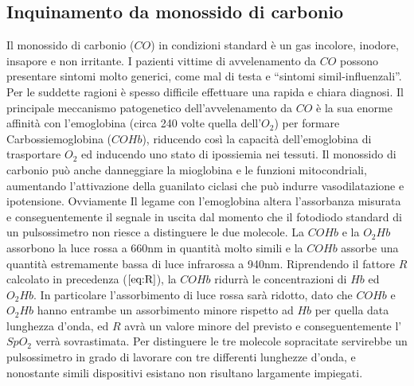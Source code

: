 \documentclass[a4paper, 12pt]{book}
\newcommand{\quotes}[1]{``#1''}
\begin{document}
\subsection{Inquinamento da monossido di carbonio}

Il monossido di carbonio ($CO$) in condizioni standard è un gas incolore, inodore, insapore e non irritante.
I pazienti vittime di avvelenamento da $CO$ possono presentare sintomi molto generici, come mal di testa e \quotes{sintomi simil-influenzali}.
Per le suddette ragioni è spesso difficile effettuare una rapida e chiara diagnosi.
Il principale meccanismo patogenetico dell'avvelenamento da $CO$ è la sua enorme affinità con l'emoglobina (circa 240 volte quella dell'$O_2$) per formare Carbossiemoglobina ($COHb$), riducendo così la capacità dell'emoglobina di trasportare $O_2$ ed inducendo uno stato di ipossiemia nei tessuti.
Il monossido di carbonio può anche danneggiare la mioglobina e le funzioni mitocondriali, aumentando l'attivazione della guanilato ciclasi che può indurre vasodilatazione e ipotensione.
Ovviamente Il legame con l'emoglobina altera l'assorbanza misurata e conseguentemente il segnale in uscita dal momento che il fotodiodo standard di un pulsossimetro non riesce a distinguere le due molecole.
La $COHb$ e la  $O_2Hb$ assorbono la luce rossa a 660nm in quantità molto simili e la $COHb$ assorbe una quantità estremamente bassa di luce infrarossa a 940nm.
Riprendendo il fattore $R$ calcolato in precedenza ($\ref{eq:R}$), la $COHb$ ridurrà le concentrazioni di $Hb$ ed $O_2Hb$.
In particolare l'assorbimento di luce rossa sarà ridotto, dato che $COHb$ e $O_2Hb$ hanno entrambe un assorbimento minore rispetto ad $Hb$ per quella data lunghezza d'onda, ed $R$ avrà un valore minore del previsto e conseguentemente l'$SpO_2$ verrà sovrastimata.
Per distinguere le tre molecole sopracitate servirebbe un pulsossimetro in grado di lavorare con tre differenti lunghezze d'onda, e nonostante simili dispositivi esistano non risultano largamente impiegati.
\end{document}
